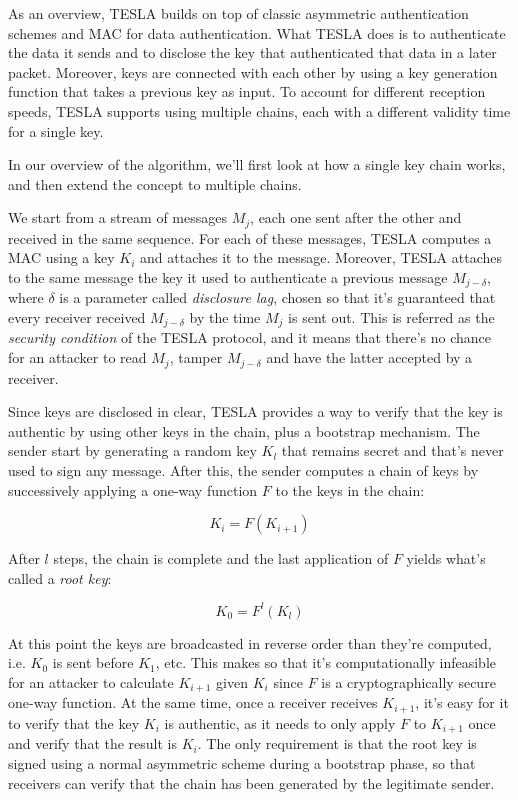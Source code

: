 As an overview, TESLA builds on top of classic asymmetric authentication schemes
and MAC for data authentication. What TESLA does is to authenticate the data it
sends and to disclose the key that authenticated that data in a later packet.
Moreover, keys are connected with each other by using a key generation function
that takes a previous key as input. To account for different reception speeds,
TESLA supports using multiple chains, each with a different validity time for a
single key.

In our overview of the algorithm, we'll first look at how a single key chain
works, and then extend the concept to multiple chains.

\par

We start from a stream of messages $M_j$, each one sent after the other and
received in the same sequence. For each of these messages, TESLA computes a MAC
using a key $K_i$ and attaches it to the message. Moreover, TESLA attaches to
the same message the key it used to authenticate a previous message
$M_{j-\delta}$, where $\delta$ is a parameter called \textit{disclosure lag},
chosen so that it's guaranteed that every receiver received $M_{j-\delta}$ by
the time $M_j$ is sent out. This is referred as the \textit{security condition}
of the TESLA protocol, and it means that there's no chance for an attacker to
read $M_j$, tamper $M_{j-\delta}$ and have the latter accepted by a receiver.

Since keys are disclosed in clear, TESLA provides a way to verify that the key
is authentic by using other keys in the chain, plus a bootstrap mechanism. The
sender start by generating a random key $K_l$ that remains secret and that's
never used to sign any message. After this, the sender computes a chain of keys
by successively applying a one-way function $F$ to the keys in the chain:

\[
  K_i = F(K_{i+1})
\]

After $l$ steps, the chain is complete and the last application of $F$ yields
what's called a \textit{root key}:

\[
  K_0 = F^l(K_l)
\]

At this point the keys are broadcasted in reverse order than they're computed,
i.e. $K_0$ is sent before $K_1$, etc. This makes so that it's computationally
infeasible for an attacker to calculate $K_{i+1}$ given $K_i$ since $F$ is a
cryptographically secure one-way function. At the same time, once a receiver
receives $K_{i+1}$, it's easy for it to verify that the key $K_i$ is authentic,
as it needs to only apply $F$ to $K_{i+1}$ once and verify that the result is
$K_i$. The only requirement is that the root key is signed using a normal
asymmetric scheme during a bootstrap phase, so that receivers can verify that
the chain has been generated by the legitimate sender.

